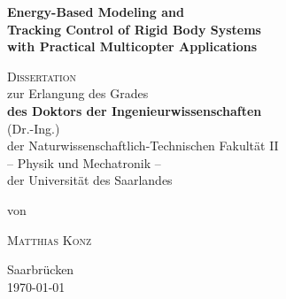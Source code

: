 \begin{titlepage}

\begin{center}

  \vspace*{1cm}

  \LARGE{\bf Energy-Based Modeling and\\ Tracking Control of Rigid Body Systems\\ with Practical Multicopter Applications} \\[1.5cm]
  
  \vfill

  {\scshape Dissertation} \\
  
  {\large zur Erlangung des Grades } \\
  
  {\Large\bfseries des Doktors der Ingenieurwissenschaften} \\[-4mm]
  {\large (Dr.-Ing.)} \\
  
  {\large der Naturwissenschaftlich-Technischen Fakultät II} \\[-4mm]
  {\large -- Physik und Mechatronik --} \\[-4mm]
  {\large der Universität des Saarlandes} \\
  
  \vspace{8mm}
  
  {\normalsize von} \\

  \vspace{8mm}
  
  {\LARGE\scshape Matthias Konz} \\
  
  \vfill

  {\large Saarbrücken} \\

  {\large \today}
  
\end{center}

\end{titlepage}